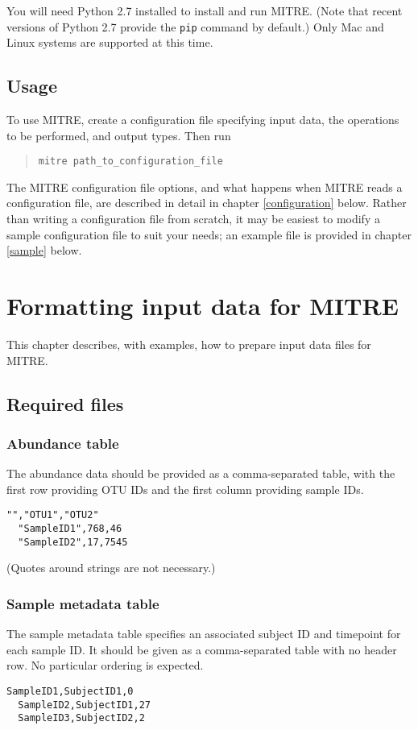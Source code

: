 \documentclass[12pt]{report}
\begin{document}
You will need Python 2.7 installed to install and run MITRE. (Note
that recent versions of Python 2.7 provide the \texttt{pip} command by
default.) Only Mac and Linux systems are supported at this time.

\section{Usage}
To use MITRE, create a configuration file specifying input data, the
operations to be performed, and output types. Then run \begin{quote} \texttt{mitre
  path\_to\_configuration\_file} \end{quote} The MITRE configuration file
options, and what happens when MITRE reads a configuration file, are
described in detail in chapter \ref{configuration} below. Rather than
writing a configuration file from scratch, it may be easiest to modify
a sample configuration file to suit your needs; an example file is
provided in chapter \ref{sample} below.


\chapter{Formatting input data for MITRE}
This chapter describes, with examples, how to prepare input data files
for MITRE.

\section{Required files}
\subsection{Abundance table}\label{abundance_data}
The abundance data should be provided as a comma-separated table,
with the first row providing OTU IDs and the first column providing
sample IDs. 
\begin{lstlisting}[caption=Example abundance data table]
  "","OTU1","OTU2"
  "SampleID1",768,46
  "SampleID2",17,7545
\end{lstlisting}
(Quotes around strings are not necessary.)

\subsection{Sample metadata table}\label{sample_metadata}
The sample metadata table specifies an associated subject ID and
timepoint for each sample ID. It should be given as a comma-separated
table with no header row. No particular ordering is expected.
\begin{lstlisting}[caption=Example sample metadata table]
  SampleID1,SubjectID1,0
  SampleID2,SubjectID1,27
  SampleID3,SubjectID2,2
\end{lstlisting}
\end{document}
